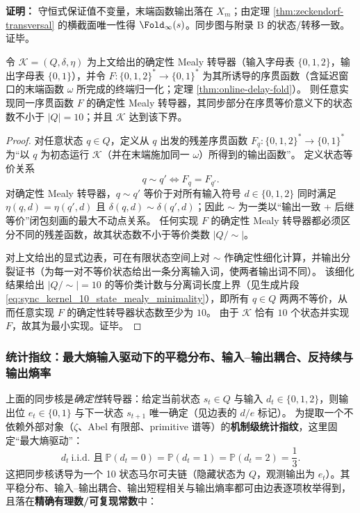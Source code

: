 \textbf{证明：}
守恒式保证值不变量，末端函数输出落在 $X_m$；由定理 \ref{thm:zeckendorf-transversal} 的横截面唯一性得 $\Fold_\infty(s)$。同步图与附录 B 的状态/转移一致。证毕。

\begin{theorem}\label{thm:online-delay-fold-sync-mealy-minimality}
令 \(\mathcal K=(Q,\delta,\eta)\) 为上文给出的确定性 Mealy 转导器（输入字母表 \(\{0,1,2\}\)，输出字母表 \(\{0,1\}\)），并令 \(F:\{0,1,2\}^\ast\to\{0,1\}^\ast\) 为其所诱导的序贯函数（含延迟窗口的末端函数 \(\omega\) 所完成的终端归一化；定理 \ref{thm:online-delay-fold}）。
则任意实现同一序贯函数 \(F\) 的确定性 Mealy 转导器，其同步部分在序贯等价意义下的状态数不小于 \(|Q|=10\)；并且 \(\mathcal K\) 达到该下界。
\end{theorem}
\begin{proof}
对任意状态 \(q\in Q\)，定义从 \(q\) 出发的残差序贯函数 \(F_q:\{0,1,2\}^\ast\to\{0,1\}^\ast\) 为“以 \(q\) 为初态运行 \(\mathcal K\)（并在末端施加同一 \(\omega\)）所得到的输出函数”。
定义状态等价关系
\[
q\sim q'\iff F_q=F_{q'}.
\]
对确定性 Mealy 转导器，\(q\sim q'\) 等价于对所有输入符号 \(d\in\{0,1,2\}\) 同时满足 \(\eta(q,d)=\eta(q',d)\) 且 \(\delta(q,d)\sim \delta(q',d)\)；因此 \(\sim\) 为一类以“输出一致 + 后继等价”闭包刻画的最大不动点关系。
任何实现 \(F\) 的确定性 Mealy 转导器都必须区分不同的残差函数，故其状态数不小于等价类数 \(|Q/{\sim}|\)。
\par
对上文给出的显式边表，可在有限状态空间上对 \(\sim\) 作确定性细化计算，并输出分裂证书（为每一对不等价状态给出一条分离输入词，使两者输出词不同）。
该细化结果给出 \(|Q/{\sim}|=10\) 的等价类计数与分离词长度上界（见生成片段 \eqref{eq:sync_kernel_10_state_mealy_minimality}），即所有 \(q\in Q\) 两两不等价，从而任意实现 \(F\) 的确定性转导器状态数至少为 \(10\)。
由于 \(\mathcal K\) 恰有 \(10\) 个状态并实现 \(F\)，故其为最小实现。证毕。
\end{proof}

\subsubsection{统计指纹：最大熵输入驱动下的平稳分布、输入--输出耦合、反持续与输出熵率}\label{subsec:sync10-stat-fingerprint}
上面的同步核是\emph{确定性}转导器：给定当前状态 $s_t\in Q$ 与输入 $d_t\in\{0,1,2\}$，则输出位 $e_t\in\{0,1\}$ 与下一状态 $s_{t+1}$ 唯一确定（见边表的 $d/e$ 标记）。
为提取一个不依赖外部对象（$\zeta$、Abel 有限部、primitive 谱等）的\textbf{机制级统计指纹}，这里固定“最大熵驱动”：
$$
d_t\ \text{i.i.d. 且}\ \mathbb P(d_t=0)=\mathbb P(d_t=1)=\mathbb P(d_t=2)=\frac{1}{3}.
$$
这把同步核诱导为一个 10 状态马尔可夫链（隐藏状态为 $Q$，观测输出为 $e_t$）。其平稳分布、输入--输出耦合、输出短程相关与输出熵率都可由边表逐项枚举得到，且落在\textbf{精确有理数/可复现常数}中：


